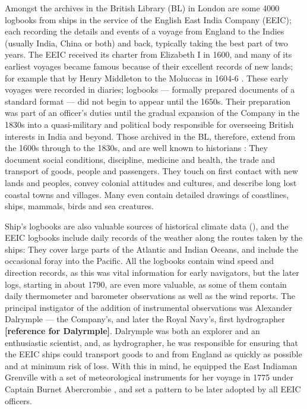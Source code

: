 \documentclass[CP]{copernicus}
\begin{document}
Amongst the archives in the British Library (BL) in London are some 4000 logbooks from ships in the service of the English East India Company (EEIC); each recording the details and events of a voyage from England to the Indies (usually India, China or both) and back, typically taking the best part of two years. The EEIC received its charter from Elizabeth I in 1600, and many of its earliest voyages became famous because of their excellent records of new lands; for example that by Henry Middleton to the Moluccas in 1604-6 \citep{Foster10}. These early voyages were recorded in diaries; logbooks --- formally prepared documents of a standard format --- did not begin to appear until the 1650s. Their preparation was part of an officer's duties until the gradual expansion of the Company in the 1830s into a quasi-military and political body responsible for overseeing British interests in India and beyond. Those archived in the BL, therefore, extend from the 1600s through to the 1830s, and are well known to historians \citep{Farrington99}: They document social conditions, discipline, medicine and health, the trade and transport of goods, people and passengers. They touch on first contact with new lands and peoples, convey colonial attitudes and cultures, and describe long lost coastal towns and villages. Many even contain detailed drawings of coastlines, ships, mammals, birds and sea creatures.    

Ship's logbooks are also valuable sources of historical climate data (\citet{chenoweth96,wheeler06cliwoc,brohan09digitisation,brohan10corral}), and the EEIC logbooks include daily records of the weather along the routes taken by the ships: They cover large parts of the Atlantic and Indian Oceans, and include the occasional foray into the Pacific. All the logbooks contain wind speed and direction records, as this was vital information for early navigators, but the later logs, starting in about 1790, are even more valuable, as some of them contain daily thermometer and barometer observations as well as the wind reports. The principal instigator of the addition of instrumental observations was Alexander Dalrymple --- the Company's, and later the Royal Navy's, first hydrographer {\bf[reference for Dalyrmple]}. Dalrymple was both an explorer and an enthusiastic scientist, and, as hydrographer, he was responsible for ensuring that the EEIC ships could transport goods to and from England as quickly as possible and at minimum risk of loss. With this in mind, he equipped the East Indiaman Grenville with a set of meteorological instruments for her voyage in 1775 under Captain Burnet Abercrombie \citep{Dalrymple78}, and set a pattern to be later adopted by all EEIC officers. 
\end{document}
